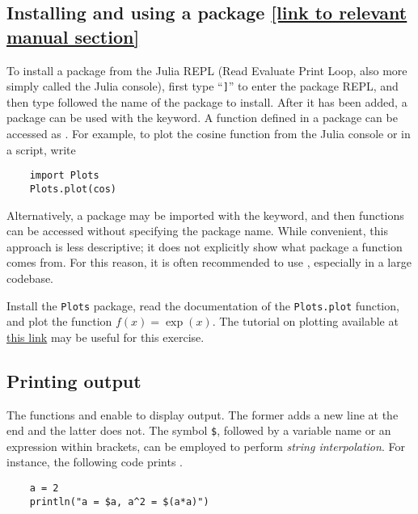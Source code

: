 
\subsection*{Installing and using a package {\footnotesize \href{https://docs.julialang.org/en/v1/stdlib/Pkg/}{[link to relevant manual section]}}}%
\label{sub:installing_and_using_a_package}
To install a package from the Julia REPL (Read Evaluate Print Loop, also more simply called the Julia console),
first type ``\texttt{]}'' to enter the package REPL,
and then type  followed the name of the package to install.
After it has been added, a package can be used with the  keyword.
A function  defined in a package  can be accessed as .
For example, to plot the cosine function from the Julia console or in a script, write
\begin{verbatim}
    import Plots
    Plots.plot(cos)
\end{verbatim}

Alternatively, a package may be imported with the  keyword,
and then functions can be accessed without specifying the package name.
While convenient, this approach is less descriptive;
it does not explicitly show what package a function comes from.
For this reason, it is often recommended to use ,
especially in a large codebase.

\begin{task}
    Install the \texttt{Plots} package,
    read the documentation of the \texttt{Plots.plot} function,
    and plot the function $f(x) = \exp(x)$.
    The tutorial on plotting available at \href{https://docs.juliaplots.org/latest/tutorial/} {this link}
    may be useful for this exercise.
\end{task}

\subsection*{Printing output}%
The functions  and  enable to display output.
The former adds a new line at the end and the latter does not.
The symbol \texttt{\$}, followed by a variable name or an expression within brackets,
can be employed to perform \emph{string interpolation}.
For instance, the following code prints .
\begin{verbatim}
    a = 2
    println("a = $a, a^2 = $(a*a)")
\end{verbatim}


